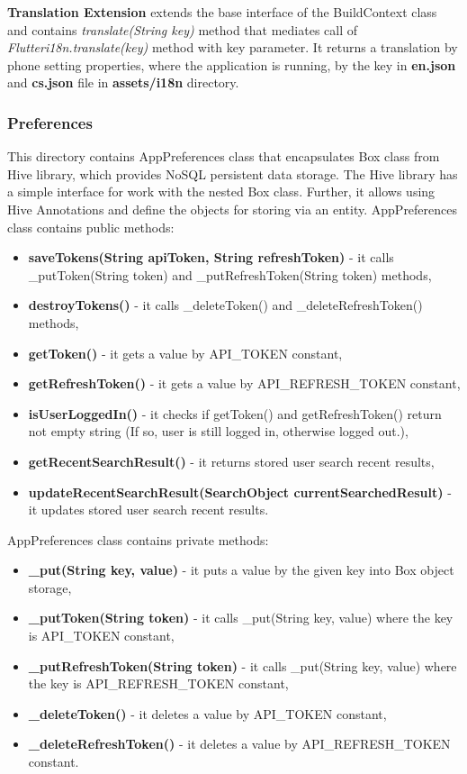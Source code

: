 \textbf{Translation Extension} extends the base interface of the BuildContext class and contains \textit{translate(String key)} method that mediates call of \textit{Flutteri18n.translate(key)} method with key parameter.
It returns a translation by phone setting properties, where the application is running, by the key in  \textbf{en.json} and \textbf{cs.json} file in \textbf{assets/i18n} directory.


\subsubsection{Preferences}\label{subsubsec:preferences}
This directory contains AppPreferences class that encapsulates Box class from Hive library, which provides NoSQL persistent data storage.
The Hive library has a simple interface for work with the nested Box class.
Further, it allows using Hive Annotations and define the objects for storing via an entity.
AppPreferences class contains public methods:
\begin{itemize}
    \item \textbf{saveTokens(String apiToken, String refreshToken)} - it calls \_putToken(String token) and \_putRefreshToken(String token) methods,
    \item \textbf{destroyTokens()} - it calls \_deleteToken() and \_deleteRefreshToken() methods,
    \item \textbf{getToken()} - it gets a value by API\_TOKEN constant,
    \item \textbf{getRefreshToken()} - it gets a value by API\_REFRESH\_TOKEN constant,
    \item \textbf{isUserLoggedIn()} - it checks if getToken() and getRefreshToken() return not empty string (If so, user is still logged in, otherwise logged out.),
    \item \textbf{getRecentSearchResult()} - it returns stored user search recent results,
    \item \textbf{updateRecentSearchResult(SearchObject currentSearchedResult)} - it updates stored user search recent results.
\end{itemize}
AppPreferences class contains private methods:
\begin{itemize}
    \item \textbf{\_put(String key, value)} - it puts a value by the given key into Box object storage,
    \item \textbf{\_putToken(String token)} - it calls \_put(String key, value) where the key is API\_TOKEN constant,
    \item \textbf{\_putRefreshToken(String token)} - it calls \_put(String key, value) where the key is API\_REFRESH\_TOKEN constant,
    \item \textbf{\_deleteToken()} - it deletes a value by API\_TOKEN constant,
    \item \textbf{\_deleteRefreshToken()} - it deletes a value by API\_REFRESH\_TOKEN constant.
\end{itemize}
